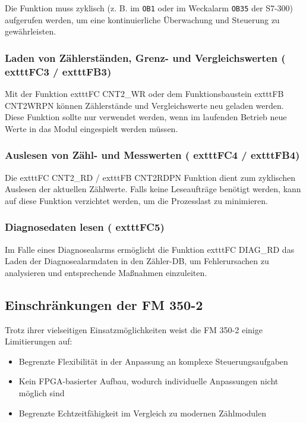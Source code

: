 Die Funktion muss zyklisch (z. B. im \texttt{OB1} oder im Weckalarm \texttt{OB35} der S7-300) aufgerufen werden, um eine kontinuierliche Überwachung und Steuerung zu gewährleisten.

\subsubsection{Laden von Zählerständen, Grenz- und Vergleichswerten (	exttt{FC3} / 	exttt{FB3})}

Mit der Funktion 	exttt{FC CNT2\_WR} oder dem Funktionsbaustein 	exttt{FB CNT2WRPN} können Zählerstände und Vergleichswerte neu geladen werden. Diese Funktion sollte nur verwendet werden, wenn im laufenden Betrieb neue Werte in das Modul eingespielt werden müssen.

\subsubsection{Auslesen von Zähl- und Messwerten (	exttt{FC4} / 	exttt{FB4})}

Die 	exttt{FC CNT2\_RD} / 	exttt{FB CNT2RDPN} Funktion dient zum zyklischen Auslesen der aktuellen Zählwerte. Falls keine Leseaufträge benötigt werden, kann auf diese Funktion verzichtet werden, um die Prozesslast zu minimieren.

\subsubsection{Diagnosedaten lesen (	exttt{FC5})}

Im Falle eines Diagnosealarms ermöglicht die Funktion 	exttt{FC DIAG\_RD} das Laden der Diagnosealarmdaten in den Zähler-DB, um Fehlerursachen zu analysieren und entsprechende Maßnahmen einzuleiten.

\subsection{Einschränkungen der FM 350-2}

Trotz ihrer vielseitigen Einsatzmöglichkeiten weist die FM 350-2 einige Limitierungen auf:
\begin{itemize}
    \item Begrenzte Flexibilität in der Anpassung an komplexe Steuerungsaufgaben
    \item Kein FPGA-basierter Aufbau, wodurch individuelle Anpassungen nicht möglich sind
    \item Begrenzte Echtzeitfähigkeit im Vergleich zu modernen Zählmodulen
\end{itemize}

